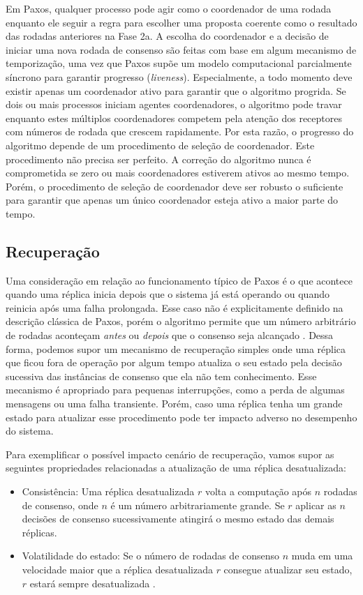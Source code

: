Em Paxos, qualquer processo pode agir como o coordenador de uma rodada enquanto ele seguir
a regra para escolher uma proposta coerente como o resultado das rodadas anteriores na
Fase 2a. A escolha do coordenador e a decisão de iniciar uma nova rodada de consenso são
feitas com base em algum mecanismo de temporização, uma vez que Paxos supõe um modelo
computacional parcialmente síncrono para garantir progresso (\emph{liveness}).
Especialmente, a todo momento deve existir apenas um coordenador ativo para garantir que o
algoritmo progrida. Se dois ou mais processos iniciam agentes coordenadores, o algoritmo
pode travar enquanto estes múltiplos coordenadores competem pela atenção dos receptores
com números de rodada que crescem rapidamente. Por esta razão, o progresso do algoritmo
depende de um procedimento de seleção de coordenador. Este procedimento não precisa ser
perfeito. A correção do algoritmo nunca é comprometida se zero ou mais coordenadores
estiverem ativos ao mesmo tempo. Porém, o procedimento de seleção de coordenador deve ser
robusto o suficiente para garantir que apenas um único coordenador esteja ativo a maior
parte do tempo.

\subsection{Recuperação}

Uma consideração em relação ao funcionamento típico de Paxos é o que acontece
quando uma réplica inicia depois que o sistema já está operando ou quando reinicia após
uma falha prolongada. Esse caso não é explicitamente definido na descrição clássica de
Paxos, porém o algoritmo permite que um número arbitrário de rodadas aconteçam
\emph{antes} ou \emph{depois} que o consenso seja alcançado \cite{lamport98}. Dessa forma,
podemos supor um mecanismo de recuperação simples onde uma réplica que ficou fora de
operação por algum tempo atualiza o seu estado pela decisão sucessiva das instâncias de
consenso que ela não tem conhecimento. Esse mecanismo é apropriado para pequenas
interrupções, como a perda de algumas mensagens ou uma falha transiente. Porém, caso uma
réplica tenha um grande estado para atualizar esse procedimento pode ter impacto adverso
no desempenho do sistema.

Para exemplificar o possível impacto cenário de recuperação, vamos supor as seguintes
propriedades relacionadas a atualização de uma réplica desatualizada:

\begin{itemize}
  \item Consistência: Uma réplica desatualizada $r$ volta a computação após $n$ rodadas de
    consenso, onde $n$ é um número arbitrariamente grande. Se $r$ aplicar as $n$ decisões
    de consenso sucessivamente atingirá o mesmo estado das demais réplicas.
  \item Volatilidade do estado: Se o número de rodadas de consenso $n$ muda em uma
    velocidade maior que a réplica desatualizada $r$ consegue atualizar seu estado, $r$
    estará sempre desatualizada \cite{vilaca09}.
\end{itemize}

